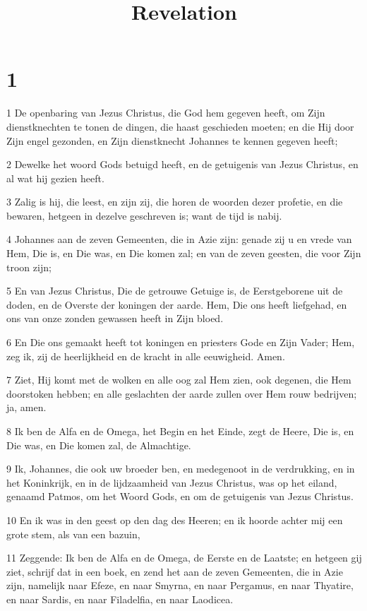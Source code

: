 

\title{Revelation}



\chapter{1}

\par 1 De openbaring van Jezus Christus, die God hem gegeven heeft, om Zijn dienstknechten te tonen de dingen, die haast geschieden moeten; en die Hij door Zijn engel gezonden, en Zijn dienstknecht Johannes te kennen gegeven heeft;
\par 2 Dewelke het woord Gods betuigd heeft, en de getuigenis van Jezus Christus, en al wat hij gezien heeft.
\par 3 Zalig is hij, die leest, en zijn zij, die horen de woorden dezer profetie, en die bewaren, hetgeen in dezelve geschreven is; want de tijd is nabij.
\par 4 Johannes aan de zeven Gemeenten, die in Azie zijn: genade zij u en vrede van Hem, Die is, en Die was, en Die komen zal; en van de zeven geesten, die voor Zijn troon zijn;
\par 5 En van Jezus Christus, Die de getrouwe Getuige is, de Eerstgeborene uit de doden, en de Overste der koningen der aarde. Hem, Die ons heeft liefgehad, en ons van onze zonden gewassen heeft in Zijn bloed.
\par 6 En Die ons gemaakt heeft tot koningen en priesters Gode en Zijn Vader; Hem, zeg ik, zij de heerlijkheid en de kracht in alle eeuwigheid. Amen.
\par 7 Ziet, Hij komt met de wolken en alle oog zal Hem zien, ook degenen, die Hem doorstoken hebben; en alle geslachten der aarde zullen over Hem rouw bedrijven; ja, amen.
\par 8 Ik ben de Alfa en de Omega, het Begin en het Einde, zegt de Heere, Die is, en Die was, en Die komen zal, de Almachtige.
\par 9 Ik, Johannes, die ook uw broeder ben, en medegenoot in de verdrukking, en in het Koninkrijk, en in de lijdzaamheid van Jezus Christus, was op het eiland, genaamd Patmos, om het Woord Gods, en om de getuigenis van Jezus Christus.
\par 10 En ik was in den geest op den dag des Heeren; en ik hoorde achter mij een grote stem, als van een bazuin,
\par 11 Zeggende: Ik ben de Alfa en de Omega, de Eerste en de Laatste; en hetgeen gij ziet, schrijf dat in een boek, en zend het aan de zeven Gemeenten, die in Azie zijn, namelijk naar Efeze, en naar Smyrna, en naar Pergamus, en naar Thyatire, en naar Sardis, en naar Filadelfia, en naar Laodicea.
